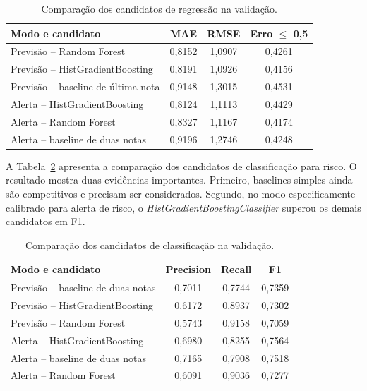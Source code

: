 \begin{table}[ht]
\caption{Compara\c{c}\~ao dos candidatos de regress\~ao na valida\c{c}\~ao.}
\label{tab:validacao-regressao}
\centering
\footnotesize
\begin{tabular}{l c c c}
\hline
\textbf{Modo e candidato} & \textbf{MAE} & \textbf{RMSE} & \textbf{Erro $\leq$ 0,5} \\
\hline
Previs\~ao -- Random Forest & 0,8152 & 1,0907 & 0,4261 \\
Previs\~ao -- HistGradientBoosting & 0,8191 & 1,0926 & 0,4156 \\
Previs\~ao -- baseline de \'ultima nota & 0,9148 & 1,3015 & 0,4531 \\
Alerta -- HistGradientBoosting & 0,8124 & 1,1113 & 0,4429 \\
Alerta -- Random Forest & 0,8327 & 1,1167 & 0,4174 \\
Alerta -- baseline de duas notas & 0,9196 & 1,2746 & 0,4248 \\
\hline
\end{tabular}
\end{table}

A Tabela~\ref{tab:validacao-classificacao} apresenta a compara\c{c}\~ao dos candidatos de classifica\c{c}\~ao para risco. O resultado mostra duas evid\^encias importantes. Primeiro, baselines simples ainda s\~ao competitivos e precisam ser considerados. Segundo, no modo especificamente calibrado para alerta de risco, o \textit{HistGradientBoostingClassifier} superou os demais candidatos em F1.

\begin{table}[ht]
\caption{Compara\c{c}\~ao dos candidatos de classifica\c{c}\~ao na valida\c{c}\~ao.}
\label{tab:validacao-classificacao}
\centering
\footnotesize
\begin{tabular}{l c c c}
\hline
\textbf{Modo e candidato} & \textbf{Precision} & \textbf{Recall} & \textbf{F1} \\
\hline
Previs\~ao -- baseline de duas notas & 0,7011 & 0,7744 & 0,7359 \\
Previs\~ao -- HistGradientBoosting & 0,6172 & 0,8937 & 0,7302 \\
Previs\~ao -- Random Forest & 0,5743 & 0,9158 & 0,7059 \\
Alerta -- HistGradientBoosting & 0,6980 & 0,8255 & 0,7564 \\
Alerta -- baseline de duas notas & 0,7165 & 0,7908 & 0,7518 \\
Alerta -- Random Forest & 0,6091 & 0,9036 & 0,7277 \\
\hline
\end{tabular}
\end{table}

